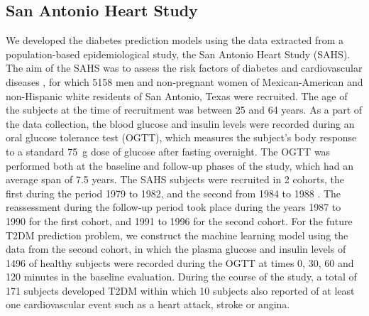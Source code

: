 \documentclass[journal,comsoc]{IEEEtran}
\renewcommand{\^}{\hat}  %
\begin{document}
\subsection{San Antonio Heart Study}
%
We developed the diabetes prediction models using the data extracted from a population-based epidemiological study, the San Antonio Heart Study (SAHS). The aim of the SAHS was to assess the risk factors of diabetes and cardiovascular diseases \cite{burke_rapid_1999, lorenzo_trend_2006}, for which \num[group-minimum-digits=4, group-separator = {,}]{5158} men and non-pregnant women of Mexican-American and non-Hispanic white residents of San Antonio, Texas were recruited. The age of the subjects at the time of recruitment was between \num{25} and \num{64} years. As a part of the data collection, the blood glucose and insulin levels were recorded during an oral glucose tolerance test (OGTT), which measures the subject's body response to a standard \SI{75}{\gram} dose of glucose after fasting overnight. The OGTT was performed both at the baseline and follow-up phases of the study, which had an average span of \num{7.5} years. The SAHS subjects were recruited in \num{2} cohorts, the first during the period \num{1979} to \num{1982}, and the second from \num{1984} to \num{1988} \cite{haffner_hyperinsulinemia_1986}. The reassessment during the follow-up period took place during the years \num{1987} to \num{1990} for the first cohort, and \num{1991} to \num{1996} for the second cohort. For the future T2DM prediction problem, we construct the machine learning model using the data from the second cohort, in which the plasma glucose and insulin levels of \num[group-minimum-digits=4, group-separator = {,}]{1496} of healthy subjects were recorded during the OGTT at times \num{0}, \num{30}, \num{60} and \num{120} minutes in the baseline evaluation. During the course of the study, a total of \num{171} subjects developed T2DM within which \num{10} subjects also reported of at least one cardiovascular event such as a heart attack, stroke or angina.
\end{document}
